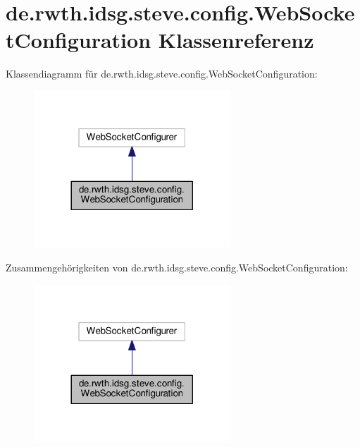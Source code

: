 \hypertarget{classde_1_1rwth_1_1idsg_1_1steve_1_1config_1_1_web_socket_configuration}{\section{de.\+rwth.\+idsg.\+steve.\+config.\+Web\+Socket\+Configuration Klassenreferenz}
\label{classde_1_1rwth_1_1idsg_1_1steve_1_1config_1_1_web_socket_configuration}
}


Klassendiagramm für de.\+rwth.\+idsg.\+steve.\+config.\+Web\+Socket\+Configuration\+:\nopagebreak
\begin{figure}[H]
\begin{center}
\leavevmode
\includegraphics[width=209pt]{classde_1_1rwth_1_1idsg_1_1steve_1_1config_1_1_web_socket_configuration__inherit__graph}
\end{center}
\end{figure}


Zusammengehörigkeiten von de.\+rwth.\+idsg.\+steve.\+config.\+Web\+Socket\+Configuration\+:\nopagebreak
\begin{figure}[H]
\begin{center}
\leavevmode
\includegraphics[width=209pt]{classde_1_1rwth_1_1idsg_1_1steve_1_1config_1_1_web_socket_configuration__coll__graph}
\end{center}
\end{figure}
